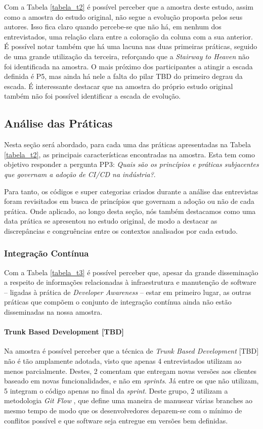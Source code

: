 Com a Tabela \ref{tabela_t2} é possível perceber que a amostra deste estudo, assim como a amostra do estudo original, não segue a evolução proposta pelos seus autores. Isso fica claro quando percebe-se que não há, em nenhum dos entrevistados, uma relação clara entre a coloração da coluna com a sua anterior. É possível notar também que há uma lacuna nas duas primeiras práticas, seguido de uma grande utilização da terceira, reforçando que a \emph{Stairway to Heaven} não foi identificada na amostra. O mais próximo dos participantes a atingir a escada definida é P5, mas ainda há nele a falta do pilar TBD do primeiro degrau da escada. É interessante destacar que na amostra do próprio estudo original também não foi possível identificar a escada de evolução.

\subsection{Análise das Práticas}

Nesta seção será abordado, para cada uma das práticas apresentadas na Tabela \ref{tabela_t2}, as principais características encontradas na amostra. Esta tem como objetivo responder a pergunta PP3: \emph{Quais são os princípios e práticas subjacentes que governam a adoção de CI/CD na indústria?}.

Para tanto, os códigos e super categorias criados durante a análise das entrevistas foram revisitados em busca de princípios que governam a adoção ou não de cada prática. Onde aplicado, ao longo desta seção, nós também destacamos como uma data prática se apresentou no estudo original, de modo a destacar as discrepâncias e congruências entre os contextos analisados por cada estudo.

\subsubsection{Integração Contínua}

Com a Tabela \ref{tabela_t3} é possível perceber que, apesar da grande disseminação a respeito de informações relacionadas à infraestrutura e manutenção de software -- ligadas à prática de \emph{Developer Awareness} \cite{awa} -- estar em primeiro lugar, as outras práticas que compõem o conjunto de integração contínua ainda não estão disseminadas na nossa amostra.

\paragraph{Trunk Based Development [TBD]}
Na amostra é possível perceber que a técnica de \emph{Trunk Based Development} [TBD] \cite{devAndDeploymentFB} não é tão amplamente adotada, visto que apenas 4 entrevistados utilizam ao menos parcialmente. Destes, 2 comentam que entregam novas versões aos clientes baseado em novas funcionalidades, e não em \emph{sprints}. Já entre os que não utilizam, 5 integram o código apenas no final da \emph{sprint}. Deste grupo, 2 utilizam a metodologia \emph{Git Flow} \cite{gitFlow}, que define uma maneira de manusear várias branches ao mesmo tempo de modo que os desenvolvedores deparem-se com o mínimo de conflitos possível e que software seja entregue em versões bem definidas.

